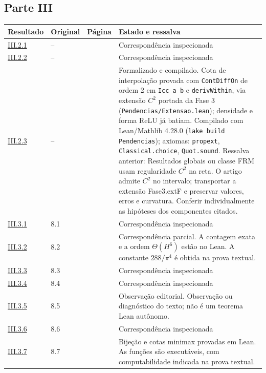 \documentclass[12pt,a4paper]{article}
\theoremstyle{preciso}
\theoremstyle{definition}
\theoremstyle{preciso}
\theoremstyle{preciso}
\theoremstyle{preciso}
\theoremstyle{preciso}
\theoremstyle{definition}
\theoremstyle{preciso}
\theoremstyle{definition}
\theoremstyle{preciso}
\theoremstyle{preciso}
\theoremstyle{definition}
\begin{document}
\begin{singlespace}
\subsection*{Parte III}
\small
\begin{longtable}{@{}p{.11\linewidth}p{.09\linewidth}p{.09\linewidth}p{.59\linewidth}@{}}
\toprule Resultado & Original & Página & Estado e ressalva\\\midrule\endhead
\hyperref[map:artigo_2:2.1]{III.2.1} & -- & \pageref{map:artigo_2:2.1} & Correspondência inspecionada\\[4pt]
\hyperref[map:artigo_2:2.2]{III.2.2} & -- & \pageref{map:artigo_2:2.2} & Correspondência inspecionada\\[4pt]
\hyperref[map:artigo_2:2.3]{III.2.3} & -- & \pageref{map:artigo_2:2.3} & Formalizado e compilado. Cota de interpolação provada com \texttt{ContDiffOn} de ordem 2 em \texttt{Icc a b} e \texttt{derivWithin}, via extensão $C^2$ portada da Fase 3 (\texttt{Pendencias/Extensao.lean}); densidade e forma ReLU já batiam. Compilado com Lean/Mathlib 4.28.0 (\texttt{lake build Pendencias}); axiomas: \texttt{propext}, \texttt{Classical.choice}, \texttt{Quot.sound}. Ressalva anterior: Resultados globais ou classe FRM usam regularidade $C^2$ na reta. O artigo admite $C^2$ no intervalo; transportar a extensão Fase3.extF e preservar valores, erros e curvatura. Conferir individualmente as hipóteses dos componentes citados.\\[4pt]
\hyperref[map:artigo_2:3.1]{III.3.1} & 8.1 & \pageref{map:artigo_2:3.1} & Correspondência inspecionada\\[4pt]
\hyperref[map:artigo_2:3.2]{III.3.2} & 8.2 & \pageref{map:artigo_2:3.2} & Correspondência parcial. A contagem exata e a ordem $\Theta(H^6)$ estão no Lean. A constante $288/\pi^4$ é obtida na prova textual.\\[4pt]
\hyperref[map:artigo_2:3.3]{III.3.3} & 8.3 & \pageref{map:artigo_2:3.3} & Correspondência inspecionada\\[4pt]
\hyperref[map:artigo_2:3.4]{III.3.4} & 8.4 & \pageref{map:artigo_2:3.4} & Correspondência inspecionada\\[4pt]
\hyperref[map:artigo_2:3.5]{III.3.5} & 8.5 & \pageref{map:artigo_2:3.5} & Observação editorial. Observação ou diagnóstico do texto; não é um teorema Lean autônomo.\\[4pt]
\hyperref[map:artigo_2:3.6]{III.3.6} & 8.6 & \pageref{map:artigo_2:3.6} & Correspondência inspecionada\\[4pt]
\hyperref[map:artigo_2:3.7]{III.3.7} & 8.7 & \pageref{map:artigo_2:3.7} & Bijeção e cotas minimax provadas em Lean. As funções são executáveis, com computabilidade indicada na prova textual.\\[4pt]

\end{longtable}
\end{singlespace}
\end{document}
